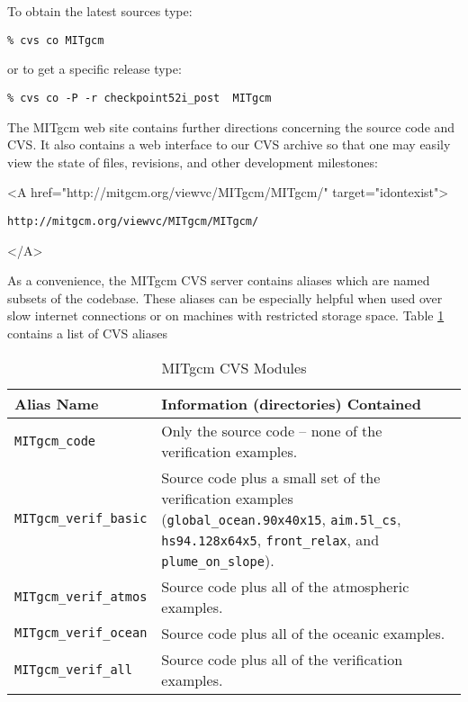To obtain the latest sources type:
\begin{verbatim}
% cvs co MITgcm
\end{verbatim}
or to get a specific release type:
\begin{verbatim}
% cvs co -P -r checkpoint52i_post  MITgcm
\end{verbatim}
The MITgcm web site contains further directions concerning the source
code and CVS.  It also contains a web interface to our CVS archive so
that one may easily view the state of files, revisions, and other
development milestones:
\begin{rawhtml} <A href="http://mitgcm.org/viewvc/MITgcm/MITgcm/" target="idontexist"> \end{rawhtml}
\begin{verbatim}
http://mitgcm.org/viewvc/MITgcm/MITgcm/
\end{verbatim}
\begin{rawhtml} </A> \end{rawhtml}

As a convenience, the MITgcm CVS server contains aliases which are
named subsets of the codebase.  These aliases can be especially
helpful when used over slow internet connections or on machines with
restricted storage space.  Table \ref{tab:cvsModules} contains a list
of CVS aliases
\begin{table}[htb]
  \centering
  \begin{tabular}[htb]{|lp{3.25in}|}\hline
    \textbf{Alias Name}    &  \textbf{Information (directories) Contained}  \\\hline
    \texttt{MITgcm\_code}  &  Only the source code -- none of the verification examples.  \\
    \texttt{MITgcm\_verif\_basic}
    &  Source code plus a small set of the verification examples 
    (\texttt{global\_ocean.90x40x15}, \texttt{aim.5l\_cs}, \texttt{hs94.128x64x5}, 
    \texttt{front\_relax}, and \texttt{plume\_on\_slope}).  \\
    \texttt{MITgcm\_verif\_atmos}  &  Source code plus all of the atmospheric examples.  \\
    \texttt{MITgcm\_verif\_ocean}  &  Source code plus all of the oceanic examples.  \\
    \texttt{MITgcm\_verif\_all}    &  Source code plus all of the
    verification examples. \\\hline
  \end{tabular}
  \caption{MITgcm CVS Modules}
  \label{tab:cvsModules}
\end{table}

